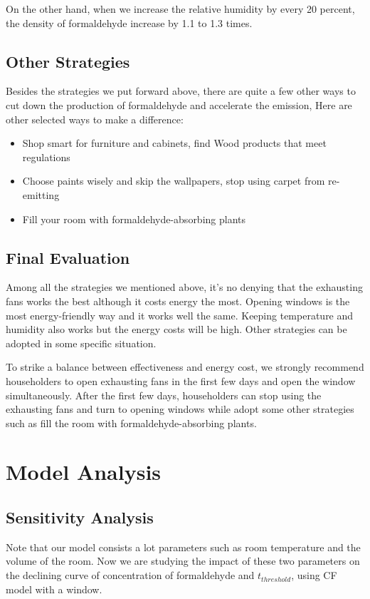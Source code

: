 \documentclass{mcmthesis}
\begin{document}
On the other hand, when we increase the relative humidity by every 20 percent, the density of formaldehyde increase by 1.1 to 1.3 times.

\subsection{Other Strategies}
Besides the strategies we put forward above, there are quite a few other ways to cut down the production of formaldehyde and accelerate the emission, Here are other selected ways to make a difference:

\begin{itemize}
    \item Shop smart for furniture and cabinets, find Wood products that meet regulations
    \item Choose paints wisely and skip the wallpapers, stop using carpet from re-emitting
    \item Fill your room with formaldehyde-absorbing plants\cite{wolverton1993plants}
\end{itemize}

\subsection{Final Evaluation}
 Among all the strategies we mentioned above, it's no denying that the exhausting fans works the best although it costs energy the most. Opening windows is the most energy-friendly way and it works well the same. Keeping temperature and humidity also works but the energy costs will be high. Other strategies can be adopted in some specific situation.
 
 To strike a balance between effectiveness and energy cost, we strongly recommend householders to open exhausting fans in the first few days and open the window simultaneously. After the first few days, householders can stop using the exhausting fans and turn to opening windows while adopt some other strategies such as fill the room with formaldehyde-absorbing plants.

\section{Model Analysis}
\subsection{Sensitivity Analysis}
Note that our model consists a lot parameters such as room temperature and the volume of the room. Now we are studying the impact of these two parameters on the declining curve of concentration of formaldehyde and $t_{threshold}$, using CF model with a window.
\end{document}
